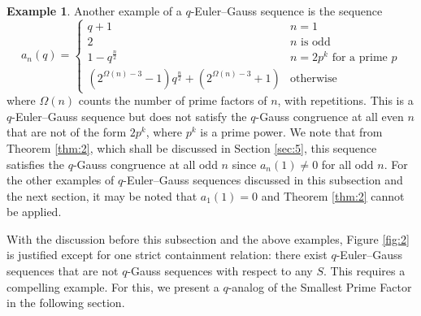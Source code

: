 \documentclass{article}
\numberwithin{equation}{section}
\theoremstyle{definition}
\newtheorem{example}[definition]{\bf {Example}}
\begin{document}
\begin{example}
    Another example of a $q$-Euler--Gauss sequence is the sequence
\[a_n(q)=\begin{cases}
    q+1&n=1\\
    2&n \text{ is odd}\\
    1-q^\frac{n}{2}&n=2p^k\text{ for a prime }p\\
    (2^{\Omega(n)-3}-1)q^\frac{n}{2}+(2^{\Omega(n)-3}+1)&\text{otherwise}
\end{cases}\]
where $\Omega(n)$ counts the number of prime factors of $n$, with repetitions. This is a $q$-Euler--Gauss sequence but does not satisfy the $q$-Gauss congruence at all even $n$ that are not of the form $2p^k$, where $p^k$ is a prime power. We note that from Theorem \ref{thm:2}, which shall be discussed in Section \ref{sec:5}, this sequence satisfies the $q$-Gauss congruence at all odd $n$ since $a_n(1)\neq0$ for all odd $n$. For the other examples of $q$-Euler--Gauss sequences discussed in this subsection and the next section, it may be noted that $a_1(1)=0$ and Theorem \ref{thm:2} cannot be applied.
\end{example}

With the discussion before this subsection and the above examples, Figure \ref{fig:2} is justified except for one strict containment relation: there exist $q$-Euler--Gauss sequences that are not $q$-Gauss sequences with respect to any $S$. This requires a compelling example. For this, we present a $q$-analog of the Smallest Prime Factor in the following section.
\end{document}
